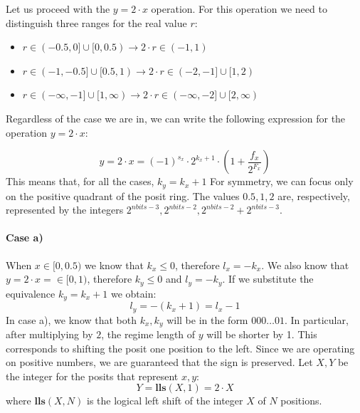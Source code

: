 Let us proceed with the $y = 2\cdot x$ operation. For this operation we need to distinguish three ranges for the real value $r$:


\begin{itemize}
    \item[a)] $r \in (-0.5,0] \cup [0,0.5) \xrightarrow{} 2\cdot r \in (-1,1)$
    \item[b)] $r \in (-1,-0.5] \cup [0.5,1) \xrightarrow{} 2\cdot r \in (-2,-1] \cup [1,2) $
    \item[c)] $r \in (-\infty, -1] \cup [1, \infty)  \xrightarrow{} 2\cdot r \in (-\infty, -2] \cup [2, \infty)$
\end{itemize}
Regardless of the case we are in, we can write the following expression for the operation $y = 2 \cdot x$:

\begin{equation}
    y = 2 \cdot x = (-1)^{s_x} \cdot 2^{k_x + 1} \cdot \left(1 + \frac{f_x}{2^{F_x}} \right) 
\end{equation}
This means that, for all the cases, $k_y = k_x + 1$
For symmetry, we can focus only on the positive quadrant of the posit ring. The values $0.5,1,2$ are, respectively, represented by the integers $2^{nbits - 3}, 2^{nbits - 2}, 2^{nbits - 2} + 2^{nbits - 3}$.

\paragraph{Case a)} When $x \in [0,0.5)$ we know that $k_x \leq 0$, therefore $l_x = -k_x$. We also know that $y = 2\cdot x = \in [0,1)$, therefore $k_y \leq 0$ and $l_y = -k_y$. If we substitute the equivalence  $k_y = k_x + 1$ we obtain:
\begin{equation}
    l_y = - (k_x + 1) = l_x - 1
\end{equation}
In case a), we know that both $k_x, k_y$ will be in the form $000 \dots 01$. In particular, after multiplying by $2$, the regime length of $y$ will be shorter by 1. This corresponds to shifting the posit one position to the left. Since we are operating on positive numbers, we are guaranteed that the sign is preserved. Let $X,Y$ be the integer for the posits that represent $x,y$:
\begin{equation}
    Y = \mathbf{lls} (X,1) = 2 \cdot X
\end{equation}
where $\mathbf{lls}(X,N)$ is the logical left shift of the integer $X$ of $N$ positions.
